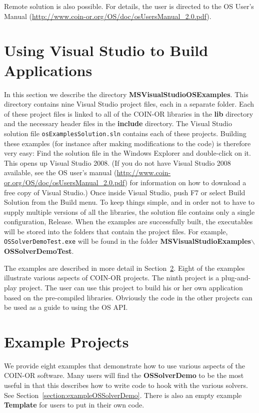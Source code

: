 \documentclass[11pt]{article}
\renewcommand{\{}{{\char"7B}}
\renewcommand{\}}{{\char"7D}}
\renewcommand{\^}{{\char"0D}}
\renewcommand{\'}{{\char"0D}}
\begin{document}
Remote solution is also possible. For details, the user is directed to the OS User's Manual
(\url{http://www.coin-or.org/OS/doc/osUsersManual_2.0.pdf}).


\section{Using Visual Studio to Build Applications}\label{section:visualstudio} 
In this section we describe the directory {\bf MSVisualStudioOSExamples}. 
This directory contains nine Visual Studio project files, each in a separate folder.  
Each of these project files is linked to all of the COIN-OR libraries in the {\bf lib} directory
and the necessary header files in the {\bf include} directory. The Visual Studio solution file 
{\tt osExamplesSolution.sln} contains each of these projects. Building these examples (for instance
after making modifications to the code) is therefore very easy: Find the solution file in the
Windows Explorer and double-click on it. This opens up Visual Studio 2008. 
(If you do not have Visual Studio 2008 available, see the OS user's manual 
(\url{http://www.coin-or.org/OS/doc/osUsersManual_2.0.pdf})
for information on how to download a free copy of Visual Studio.) 
Once inside Visual Studio, push F7 or select Build Solution from the Build menu.
To keep things simple, and in order not to have to supply multiple versions of all the libraries,
the solution file contains only a single configuration, Release.
When the examples are successfully built, the executables will be stored into the folders that
contain the project files. For example, {\tt OSSolverDemoTest.exe} will be found in the folder 
{\bf MSVisualStudioExamples$\backslash$OSSolverDemoTest}.
 
The examples are described in more detail in Section~\ref{section:examples}. Eight of the examples 
illustrate various aspects of COIN-OR projects.   The ninth project is  a plug-and-play project. 
The user can use this project to build his or her own application based on the pre-compiled libraries.
Obviously the code in the other projects can be used as a guide to using the OS API.

\section{Example Projects}\label{section:examples}

We provide eight examples that demonstrate how to use various aspects of the COIN-OR  software.  
Many users will find the {\bf OSSolverDemo} to be the most useful in that this describes 
how to write code to hook with the various solvers.  See Section~\ref{section:exampleOSSolverDemo}.  
There is also an empty example {\bf Template} for users to put in their own code. 
\end{document}
